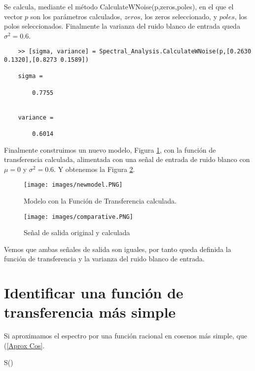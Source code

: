 \documentclass[a4paper, fontsize=11pt]{scrartcl} %
\numberwithin{equation}{section} %
\numberwithin{figure}{section} %
\numberwithin{table}{section} %
\newenvironment{myalign}{\par\nobreak\large\noindent\align}{\endalign} %
\begin{document}
	Se calcula, mediante el método CalculateWNoise(p,zeros,poles), en el que el vector $p$ son los parámetros calculados, $zeros$, los zeros seleccionado, y $poles$, los polos seleccionados. Finalmente la varianza del ruido blanco de entrada queda \textbf{$\sigma^2 = 0.6$}.
	
	\begin{lstlisting}
	>> [sigma, variance] = Spectral_Analysis.CalculateWNoise(p,[0.2630 0.1320],[0.8273 0.1589])
	
	sigma =
	
		0.7755
	
	
	variance =
	
		0.6014
	\end{lstlisting}
	
	
	
	Finalmente construimos un nuevo modelo, Figura \ref{New Model}, con la función de transferencia calculada, alimentada con una señal de entrada de ruido blanco con $\mu = 0$ y $\sigma^2 = 0.6$. Y obtenemos la Figura \ref{Comparative Output}. 
	
	\begin{figure}[h!]
		\centering
		\texttt{[image: images/newmodel.PNG]}
		\caption{Modelo con la Función de Transferencia calculada.}
		\label{New Model}
	\end{figure}
	\FloatBarrier
	
	\begin{figure}[h!]
		\centering
		\texttt{[image: images/comparative.PNG]}
		\caption{Señal de salida original y calculada}
		\label{Comparative Output}
	\end{figure}
	\FloatBarrier
	
	Vemos que ambas señales de salida son iguales, por tanto queda definida la función de transferencia y la varianza del ruido blanco de entrada.
	
	\section{Identificar una función de transferencia más simple}
	
	Si aproximamos el espectro por una función racional en cosenos más simple, que (\ref{Aprox Cos}.
	
	\begin{myalign}
		S(\omega) \approx {}
		\label{Aprox Cos Simple}
	\end{myalign}
	
\end{document}
